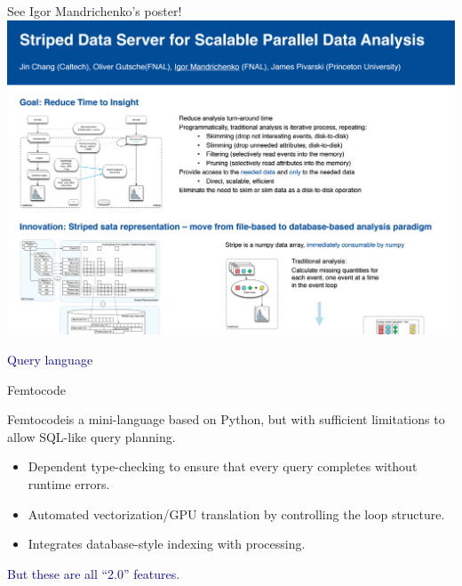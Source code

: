 \documentclass{beamer}
\begin{document}
\begin{frame}{See Igor Mandrichenko's poster!}
\vspace{0.5 cm}
\mbox{\hspace{-0.5 cm}\includegraphics[width=1.1\linewidth]{igor.png}}
\end{frame}

\begin{frame}
\begin{center}
\huge \textcolor{darkblue}{Query language}
\end{center}
\end{frame}

\begin{frame}{Femtocode}
\vspace{0.5 cm}

Femtocode\footnotemark[1] is a mini-language based on Python, but with sufficient limitations to allow SQL-like query planning.

\vspace{0.25 cm}
\begin{itemize}\setlength{\itemsep}{0.25 cm}
\item Dependent type-checking to ensure that every query completes without runtime errors.
\item Automated vectorization/GPU translation by controlling the loop structure.
\item Integrates database-style indexing with processing.
\end{itemize}

\vspace{0.25 cm}
\textcolor{darkblue}{But these are all ``2.0'' features.}

\end{frame}
\end{document}
